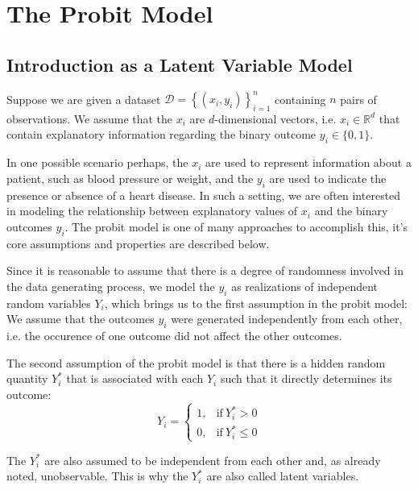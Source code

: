 \section{The Probit Model}

\cite{regression-fahrmeir}
\cite{glm-nelder}
\cite{glm-agresti}

\subsection{Introduction as a Latent Variable Model}

Suppose we are given a dataset
$\mathcal{D} = \left\{ (x_i, y_i) \right\}_{i=1}^n$
containing $n$ pairs of observations.
We assume that the $x_i$ are $d$-dimensional vectors, i.e.
$x_i \in \mathbb{R}^d$ that contain explanatory information regarding
the binary outcome $y_i \in \{ 0,  1 \}$.

In one possible scenario perhaps, the $x_i$ are used to represent information
about a patient, such as blood pressure or weight, and the $y_i$ are used to indicate
the presence or absence of a heart disease.
In such a setting, we are often interested in modeling the relationship
between explanatory values of $x_i$ and the binary outcomes $y_i$.
The probit model is one of many approaches to accomplish this, it's
core assumptions and properties are described below.

Since it is reasonable to assume that there is a degree of randomness
involved in the data generating process, we model the $y_i$ as realizations
of independent random variables $Y_i$,
which brings us to the first assumption in the probit model:
We assume that the outcomes $y_i$ were generated independently
from each other, i.e. the occurence of one outcome did not affect
the other outcomes.

The second assumption of the probit model is that there is
a hidden random quantity
$Y_i^\ast$ that is associated with each $Y_i$ such that it
directly determines its outcome:
\begin{equation}
    Y_i =
    \begin{cases}
        1, & \text{if}\ Y_i^\ast > 0    \\
        0, & \text{if}\ Y_i^\ast \leq 0
    \end{cases}
\end{equation}

\noindent The $Y_i^\ast$ are also assumed to be independent from each
other and, as already noted, unobservable.
This is why the $Y_i^\ast$ are also called latent variables.

